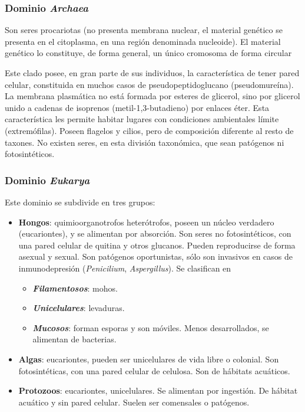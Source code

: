\subsubsection{Dominio \textit{Archaea}}
Son seres procariotas (no presenta membrana nuclear, el material genético se presenta en el citoplasma, en una región denominada nucleoide). El material genético lo constituye, de forma general, un único cromosoma de forma circular 

Este clado posee, en gran parte de sus individuos, la característica de tener pared celular, constituida en muchos casos de pseudopeptidoglucano (pseudomureína). La membrana plasmática no está formada por esteres de glicerol, sino por glicerol unido a cadenas de isoprenos (metil-1,3-butadieno) por enlaces éter. Esta característica les permite habitar lugares con condiciones ambientales límite (extremófilas). Poseen flagelos y cilios, pero de composición diferente al resto de taxones. No existen seres, en esta división taxonómica, que sean patógenos ni fotosintéticos.
\subsubsection{Dominio \textit{Eukarya}}
Este dominio se subdivide en tres grupos:
\begin{itemize}[itemsep=0pt,parsep=0pt,topsep=0pt,partopsep=0pt]
	\item \textbf{Hongos}: quimioorganotrofos heterótrofos, poseen un núcleo verdadero (eucariontes), y se alimentan por absorción. Son seres no fotosintéticos, con una pared celular de quitina y otros glucanos. Pueden reproducirse de forma asexual y sexual. Son patógenos oportunistas, sólo son invasivos en casos de inmunodepresión (\textit{Penicilium}, \textit{Aspergillus}). Se clasifican en 
	\begin{itemize}[itemsep=0pt,parsep=0pt,topsep=0pt,partopsep=0pt]
		\item \textit{\textbf{Filamentosos}}: mohos.
		\item \textit{\textbf{Unicelulares}}: levaduras.
		\item \textit{\textbf{Mucosos}}: forman esporas y son móviles. Menos desarrollados, se alimentan de bacterias.
	\end{itemize}
	\item \textbf{Algas}: eucariontes, pueden ser unicelulares de vida libre o colonial. Son fotosintéticas, con una pared celular de celulosa. Son de hábitats acuáticos.
	\item \textbf{Protozoos}: eucariontes, unicelulares. Se alimentan por ingestión. De hábitat acuático y sin pared celular. Suelen ser comensales o patógenos.
\end{itemize}
